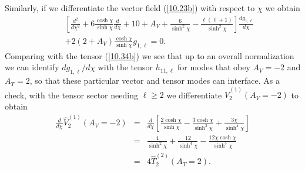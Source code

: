 Similarly, if we differentiate the vector field (\ref{10.23b}) with respect to $\chi$ we  obtain
%
\begin{eqnarray}
&&\left[\frac{d^2}{d\chi^2}+6\frac{\cosh\chi}{ \sinh\chi}\frac{d }{d\chi}
+10+A_V+\frac{6 }{ \sinh^2\chi}-\frac{\ell(\ell+1)}{ \sinh^2\chi}\right]\frac{d g_{1,\ell}}{d \chi}
\nonumber\\
&&+2(2+A_V)\frac{\cosh\chi}{\sinh\chi}g_{1,\ell}=0.
\label{11.3}
\end{eqnarray}
%
Comparing with the tensor (\ref{10.34b}) we see that up to an overall normalization we can identify $d g_{1,\ell}/d\chi$ with the tensor $h_{11,\ell}$ for modes that obey $A_V=-2$ and $A_T=2$, so that these particular vector and tensor modes can interface. As a check, with the tensor sector needing $\ell \geq 2$ we differentiate $\hat{V}^{(1)}_2(A_V=-2)$ to obtain
%  
\begin{eqnarray}
\frac{d}{d \chi}\hat{V}^{(1)}_2(A_V=-2)&=& \frac{d}{d \chi}\left[\frac{2\cosh\chi}{\sinh\chi}-\frac{3\cosh\chi }{\sinh^3\chi}+\frac{3\chi}{\sinh^4\chi}\right]
\nonumber\\
&=&\frac{4}{\sinh^2\chi}+\frac{12}{\sinh^4\chi}-\frac{12\chi\cosh\chi}{\sinh^5\chi}
\nonumber\\
&=&4\hat{T}^{(2)}_2(A_T=2).~~
\label{11.4}
\end{eqnarray}
%

